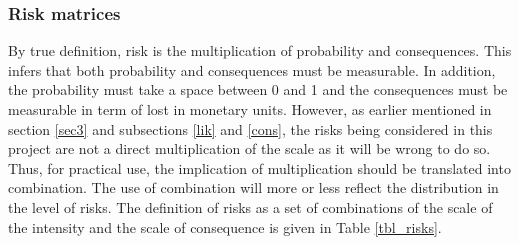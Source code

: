 \documentclass[10pt,halfline,a4paper]{ouparticle}
\begin{document}
\subsubsection{Risk matrices}
By true definition, risk is the multiplication of probability and consequences. This infers that both probability and consequences must be measurable. In addition, the probability must take a space between 0 and 1 and the consequences must be measurable in term of lost in monetary units. However, as earlier mentioned in section \ref{sec3} and subsections \ref{lik} and \ref{cons}, the risks being considered in this project are not a direct multiplication of the scale as it will be wrong to do so. Thus, for practical use, the implication of multiplication should be translated into combination. The use of combination will more or less reflect the distribution in the level of risks. The definition of risks as a set of combinations of the scale of the intensity and the scale of consequence is given in Table \ref{tbl_risks}.
\end{document}
